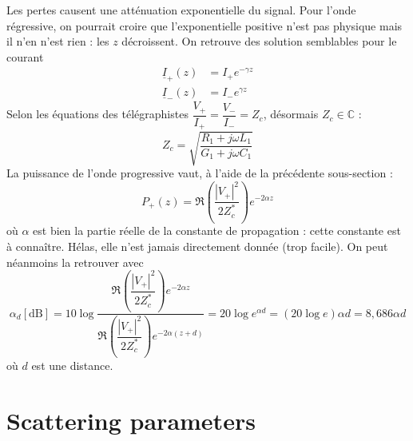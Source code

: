 	Les pertes causent une atténuation exponentielle du signal. Pour l'onde régressive, on 
	pourrait croire que l'exponentielle positive n'est pas physique mais il n'en n'est rien : 
	les $z$ décroissent. On retrouve des solution semblables pour le courant
	\begin{equation}
	\begin{array}{ll}
	\underline{I}_+(z) &= I_+e^{-\gamma z}\\
	\underline{I}_-(z) &= I_-e^{\gamma z}	
	\end{array}
	\end{equation}
	Selon les équations des télégraphistes $\displaystyle \dfrac{V_+}{I_+}=\dfrac{V_-}{I_-}=Z_c$, 
	désormais $Z_c\in\mathbb{C}$ :
	\begin{equation}
	Z_c=\sqrt{\dfrac{R_1+j\omega L_1}{G_1+j\omega C_1}}
	\end{equation}
	La puissance de l'onde progressive vaut, à l'aide de la précédente sous-section :
	\begin{equation}
	P_+(z) = \Re\left(\dfrac{|V_+|^2}{2Z_c^*}\right)e^{-2\alpha z}
	\end{equation}
	où $\alpha$ est bien la partie réelle de la constante de propagation : cette constante 
	est à connaître. Hélas, elle n'est jamais directement donnée (trop facile). On peut 
	néanmoins la retrouver avec
	\begin{equation}
	\alpha_d[\text{dB}] = 10\log\dfrac{\Re\left(\dfrac{|V_+|^2}{2Z_c^*}\right)e^{-2\alpha z}}{
	\Re\left(\dfrac{|V_+|^2}{2Z_c^*}\right)e^{-2\alpha (z+d)}} = 20\log e^{\alpha d} = 
	(20\log e)\alpha d = 8,686\alpha d
	\end{equation}
	où $d$ est une distance.
	
	
\section{Scattering parameters}

